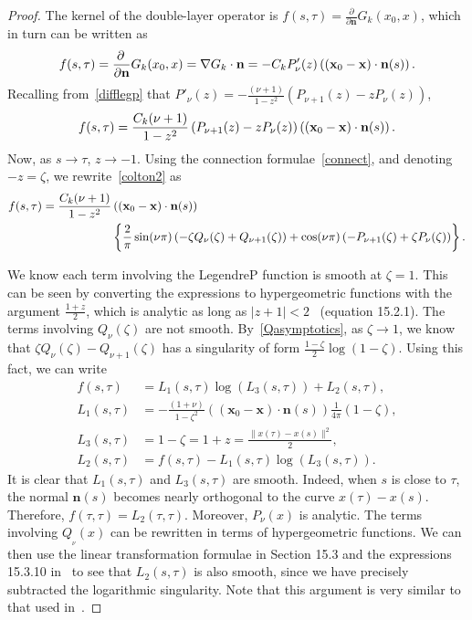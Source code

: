 \begin{proof}
The kernel of the double-layer operator is $f(s,\tau)=
\frac{\partial}{\partial \mathbf{n}} G_{k}({x}_{0},{x})$, which in turn
can be written as 
\begin{align*}
  f(s,\tau)=\frac{\partial \, }{\partial \mathbf{n}} G_{k}(x_{0},x) 
  =\nabla G_{k} \cdot \mathbf{n}
  =-C_k P'_{\nu}(z)\left(
    (\mathbf{x}_{0}-\mathbf{x})\cdot \mathbf{n}(s) \right).
\end{align*}
Recalling from~\eqref{difflegp} that
$P'_{\nu}(z)=-\frac{(\nu+1)}{1-z^{2}}(P_{\nu+1}(z)-z P_{\nu}(z))$,
\begin{align}
  f(s,\tau)= \frac{C_k(\nu+1)}{1-z^2} \left(
    P_{\nu+1}(z)-zP_{\nu}(z)\right)\left(
  (\mathbf{x}_0-\mathbf{x})\cdot \mathbf{n}(s) \right).
  \label{colton2}
\end{align}
Now, as $s \rightarrow \tau$, $z \rightarrow -1.$ Using the connection
formulae~\eqref{connect}, and denoting $-z = \zeta$, we
rewrite~\eqref{colton2} as
\begin{align*}
 f(s,\tau)= \frac{C_k(\nu+1)}{1-z^2}&\left(
   (\mathbf{x}_0-\mathbf{x})\cdot \mathbf{n}(s) \right) \nonumber \\
    &\left\{ \frac{2}{\pi}\sin(\nu\pi)
    \left( -\zeta Q_{\nu}(\zeta) + Q_{\nu+1}(\zeta)\right) 
    +\cos(\nu\pi)\left(
    -P_{\nu+1}(\zeta)+\zeta P_\nu(\zeta)\right)\right\}.
\end{align*}

We know each term involving the LegendreP function is smooth at
$\zeta=1$.  This can be seen by converting the expressions to
hypergeometric functions with the argument $\frac{1+z}{2}$, which is
analytic as long as $|z+1| < 2$~\cite{fatAbramowitz} (equation 15.2.1).
The terms involving $Q_{\nu}(\zeta)$ are not smooth.
By~\eqref{Qasymptotics}, as $\zeta \rightarrow 1$, we know that $\zeta
Q_\nu(\zeta) - Q_{\nu+1}(\zeta)$ has a singularity of form
$\frac{1-\zeta}{2}\log(1-\zeta)$.  Using this fact, we can write
\begin{align*}
 f(s,\tau)&= L_{1}(s,\tau)\log(L_3(s,\tau)) + L_2(s,\tau), \\
 L_1(s,\tau) &= - \frac{(1+\nu)}{1-\zeta^2}\left(
    (\mathbf{x}_{0}-\mathbf{x})\cdot \mathbf{n}(s) \right) 
    \frac{1}{4\pi}(1-\zeta), \\ 
 L_{3}(s,\tau)&= 1-\zeta = 1+ z = \frac{\|x(\tau) - x(s)\|^2}{2}, \\
 L_{2}(s,\tau)&= f(s,\tau) - L_{1}(s,\tau)\log(L_{3}(s,\tau)).
\end{align*}
It is clear that $L_{1}(s,\tau)$ and $L_{3}(s,\tau)$ are smooth.
Indeed, when $s$ is close to $\tau$, the normal $\mathbf{n}(s)$ becomes
nearly orthogonal to the curve $x(\tau)-x(s)$. Therefore, $f(\tau,\tau)
= L_{2}(\tau,\tau).$  Moreover, $P_{\nu}(x)$ is analytic. The terms
involving $Q_{_\nu}(x)$ can be rewritten in terms of hypergeometric
functions. We can then use the linear transformation formulae in
Section 15.3 and the expressions 15.3.10 in~\cite{fatAbramowitz} to see
that $L_{2}(s,\tau)$ is also smooth, since we have precisely subtracted
the logarithmic singularity. Note that this argument is very similar to
that used in~\cite{coltonkress}.


\end{proof}
